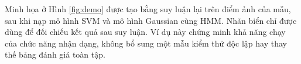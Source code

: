 
Minh họa ở Hình \ref{fig:demo} được tạo bằng suy luận lại trên điểm ảnh của mẫu, sau khi nạp mô hình SVM và mô hình Gaussian cùng HMM. Nhãn biển chỉ được dùng để đối chiếu kết quả sau suy luận. Ví dụ này chứng minh khả năng chạy của chức năng nhận dạng, không bổ sung một mẫu kiểm thử độc lập hay thay thế bảng đánh giá toàn tập.
